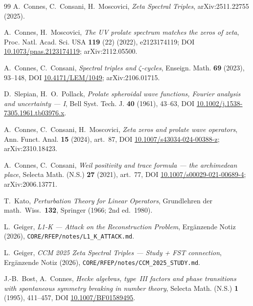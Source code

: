 \documentclass[11pt,a4paper]{article}
\theoremstyle{plain}
\theoremstyle{definition}
\begin{document}
\begin{thebibliography}{99}
A.~Connes, C.~Consani, H.~Moscovici,
\textit{Zeta Spectral Triples},
arXiv:2511.22755 (2025).

A.~Connes, H.~Moscovici,
\textit{The UV prolate spectrum matches the zeros of zeta},
Proc. Natl. Acad. Sci. USA \textbf{119} (22) (2022), e2123174119;
DOI \href{https://doi.org/10.1073/pnas.2123174119}{10.1073/pnas.2123174119};
arXiv:2112.05500.

A.~Connes, C.~Consani,
\textit{Spectral triples and $\zeta$-cycles},
Enseign. Math. \textbf{69} (2023), 93--148,
DOI \href{https://doi.org/10.4171/LEM/1049}{10.4171/LEM/1049};
arXiv:2106.01715.

D.~Slepian, H.~O.~Pollack,
\textit{Prolate spheroidal wave functions, Fourier analysis and
uncertainty --- I},
Bell Syst. Tech. J. \textbf{40} (1961), 43--63,
DOI \href{https://doi.org/10.1002/j.1538-7305.1961.tb03976.x}{10.1002/j.1538-7305.1961.tb03976.x}.

A.~Connes, C.~Consani, H.~Moscovici,
\textit{Zeta zeros and prolate wave operators},
Ann. Funct. Anal. \textbf{15} (2024), art.~87,
DOI \href{https://doi.org/10.1007/s43034-024-00388-z}{10.1007/s43034-024-00388-z};
arXiv:2310.18423.

A.~Connes, C.~Consani,
\textit{Weil positivity and trace formula --- the archimedean place},
Selecta Math. (N.S.) \textbf{27} (2021), art.~77,
DOI \href{https://doi.org/10.1007/s00029-021-00689-4}{10.1007/s00029-021-00689-4};
arXiv:2006.13771.

T.~Kato,
\textit{Perturbation Theory for Linear Operators},
Grundlehren der math.\ Wiss.\ \textbf{132}, Springer (1966; 2nd ed.\ 1980).

L.~Geiger,
\textit{L1-K --- Attack on the Reconstruction Problem},
Ergänzende Notiz (2026),
\texttt{CORE/RFEP/notes/L1\_K\_ATTACK.md}.

L.~Geiger,
\textit{CCM 2025 Zeta Spectral Triples --- Study + FST connection},
Ergänzende Notiz (2026),
\texttt{CORE/RFEP/notes/CCM\_2025\_STUDY.md}.

J.-B.~Bost, A.~Connes,
\textit{Hecke algebras, type~III factors and phase transitions
with spontaneous symmetry breaking in number theory},
Selecta Math. (N.S.) \textbf{1} (1995), 411--457,
DOI \href{https://doi.org/10.1007/BF01589495}{10.1007/BF01589495}.


\end{thebibliography}
\end{document}
